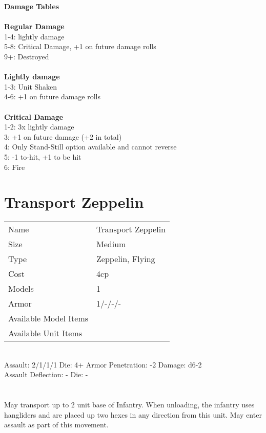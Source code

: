 {\bf Damage Tables} \\
\ \\ {\bf Regular Damage } \\
1-4: lightly damage \\
5-8: Critical Damage, +1 on future damage rolls \\
9+: Destroyed \\
\ \\ {\bf Lightly damage } \\
1-3: Unit Shaken \\
4-6: +1 on future damage rolls \\
\ \\ {\bf Critical Damage } \\
1-2: 3x lightly damage \\
3: +1 on future damage (+2 in total) \\
4: Only Stand-Still option available and cannot reverse \\
5: -1 to-hit, +1 to be hit \\
6: Fire \\









\pagebreak

\section{ Transport Zeppelin }

\begin{tabular}{ll}
  Name & Transport Zeppelin \\
  Size & Medium\\
  Type & Zeppelin, Flying\\
  Cost & 4cp\\
  Models & 1\\
  Armor & 1/-/-/-\\
  Available Model Items &  \\
  Available Unit Items &  \\
\end{tabular}

\ \\
Assault: 2/1/1/1 Die: 4+ Armor Penetration: -2 Damage: d6-2 \\
Assault Deflection: - Die: -\\
\indent  \\
\ \\
May transport up to 2 unit base of Infantry. When unloading, the infantry uses hangliders and are placed up two hexes in any direction from this unit. May enter assault as part of this movement.
\ \\


